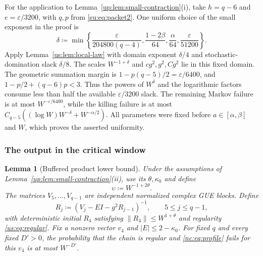 \documentclass[11pt]{article}
\numberwithin{equation}{section}
\newtheorem{lemma}[theorem]{Lemma}
\theoremstyle{remark}
\newcommand{\norm}[1]{\left\|#1\right\|}
\begin{document}
For the application to Lemma~\ref{up:lem:small-contraction}(i), take
$h=q-6$ and $e=\varepsilon/3200$, with $q,p$ from \eqref{su:eq:packet2}.
One uniform choice of the small exponent in the proof is
\begin{equation}\label{su:eq:packet3}
 \delta\coloneqq
 \min\left\{\frac{\varepsilon}{204800(q-4)},\frac{1-2\beta}{64},
             \frac\alpha{64},\frac{\varepsilon}{51200}\right\}.
\end{equation}
Apply Lemma~\ref{us:lem:local-law} with domain exponent $\delta/4$
and stochastic-domination slack $\delta/8$. The scales $W^{-1+\delta}$
and $cg^2,g^2,Cg^2$ lie in this fixed domain. The geometric summation
margin is $1-p(q-5)/2=\varepsilon/6400$, and $1-p/2+(q-6)p<3$.
Thus the powers of $W^{\delta}$ and the logarithmic factors consume
less than half the available $\varepsilon/3200$ slack. The remaining Markov
failure is at most $W^{-\varepsilon/6400}$, while the killing failure is at most
$C_{q-5}((\log W)W^{-\delta}+W^{-\alpha/2})$. All parameters were fixed
before $a\in[\alpha,\beta]$ and $W$, which proves the asserted
uniformity.

\subsubsection{The output in the critical window}
\label{app:buffered-output}

\begin{lemma}[Buffered product lower bound]\label{nc:lem:buffer}
Under the assumptions of Lemma~\ref{up:lem:small-contraction}(ii),
use its $\theta,\kappa_0$ and define
\[
 \upsilon\coloneqq W^{-1+2\theta}.
\]
The matrices $V_5,\ldots,V_{q-1}$ are independent normalized complex GUE blocks.
Define
\[
 R_j\coloneqq (V_j-EI-g^2R_{j-1})^{-1},\qquad 5\le j\le q-1,
\]
with deterministic initial $R_4$ satisfying $\norm{R_4}\le W^{1+\theta}$ and regularity
\eqref{us:eq:regular}. Fix a nonzero vector $v_4$ and $|E|\le2-\kappa_0$.
For fixed $q$ and every fixed $D'>0$, the probability that the chain is
regular and \eqref{nc:eq:profile} fails for this $v_4$ is at most $W^{-D'}$.
\end{lemma}
\end{document}
